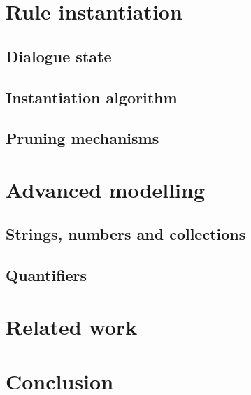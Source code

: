\section{Rule instantiation}

\subsection{Dialogue state}

\subsection{Instantiation algorithm}

\subsection{Pruning mechanisms}

\section{Advanced modelling}

\subsection{Strings, numbers and collections}

\subsection{Quantifiers}

\section{Related work}

\section{Conclusion}

